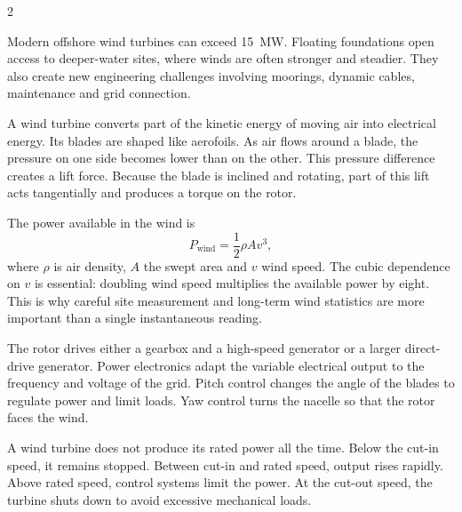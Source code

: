 

\begin{multicols}{2}

\begin{engineeringnews}
Modern offshore wind turbines can exceed 15~MW. Floating foundations open access to
 deeper-water sites, where winds are often stronger and steadier. They also create new
engineering challenges involving moorings, dynamic cables, maintenance and grid connection.
\end{engineeringnews}

\begin{ecarticle}
A wind turbine converts part of the kinetic energy of moving air into electrical energy.
Its blades are shaped like aerofoils. As air flows around a blade, the pressure on one side
becomes lower than on the other. This pressure difference creates a lift force. Because the
blade is inclined and rotating, part of this lift acts tangentially and produces a torque on
the rotor.

The power available in the wind is
\[
P_{\mathrm{wind}}=\frac{1}{2}\rho A v^3,
\]
where $\rho$ is air density, $A$ the swept area and $v$ wind speed. The cubic dependence on
$v$ is essential: doubling wind speed multiplies the available power by eight. This is why
careful site measurement and long-term wind statistics are more important than a single
instantaneous reading.

The rotor drives either a gearbox and a high-speed generator or a larger direct-drive
generator. Power electronics adapt the variable electrical output to the frequency and
voltage of the grid. Pitch control changes the angle of the blades to regulate power and
limit loads. Yaw control turns the nacelle so that the rotor faces the wind.

A wind turbine does not produce its rated power all the time. Below the cut-in speed, it
remains stopped. Between cut-in and rated speed, output rises rapidly. Above rated speed,
control systems limit the power. At the cut-out speed, the turbine shuts down to avoid
excessive mechanical loads.
\end{ecarticle}


\end{multicols}
